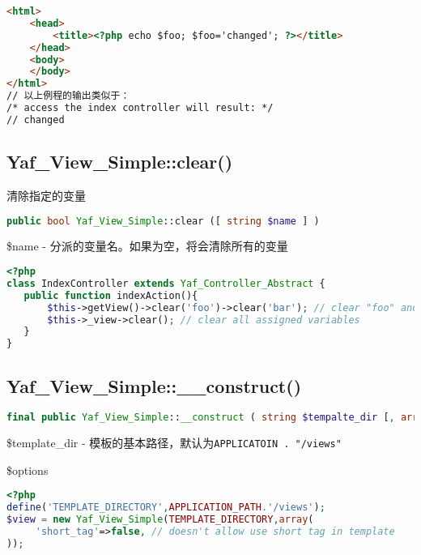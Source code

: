 \begin{lstlisting}[language=HTML]
<html>
    <head>
        <title><?php echo $foo; $foo='changed'; ?></title>
    </head>
    <body>
    </body>
</html>
// 以上例程的输出类似于：
/* access the index controller will result: */
// changed
\end{lstlisting}




\subsection{Yaf\_View\_Simple::clear()}

清除指定的变量

\begin{lstlisting}[language=PHP]
public bool Yaf_View_Simple::clear ([ string $name ] )
\end{lstlisting}

\begin{compactitem}
\item \$name - 分派的变量名。如果为空，将会清除所有的变量
\end{compactitem}



\begin{lstlisting}[language=PHP]
<?php
class IndexController extends Yaf_Controller_Abstract {
   public function indexAction(){
       $this->getView()->clear('foo')->clear('bar'); // clear "foo" and "bar"
       $this->_view->clear(); // clear all assigned variables
   }
}
\end{lstlisting}


\subsection{Yaf\_View\_Simple::\_\_construct()}


\begin{lstlisting}[language=PHP]
final public Yaf_View_Simple::__construct ( string $tempalte_dir [, array $options ] )
\end{lstlisting}


\begin{compactitem}
\item \$template\_dir - 模板的基本路径，默认为\texttt{APPLICATOIN . "/views"}
\item \$options
\end{compactitem}


\begin{lstlisting}[language=PHP]
<?php
define('TEMPLATE_DIRECTORY',APPLICATION_PATH.'/views');
$view = new Yaf_View_Simple(TEMPLATE_DIRECTORY,array(
     'short_tag'=>false, // doesn't allow use short tag in template
));
\end{lstlisting}




